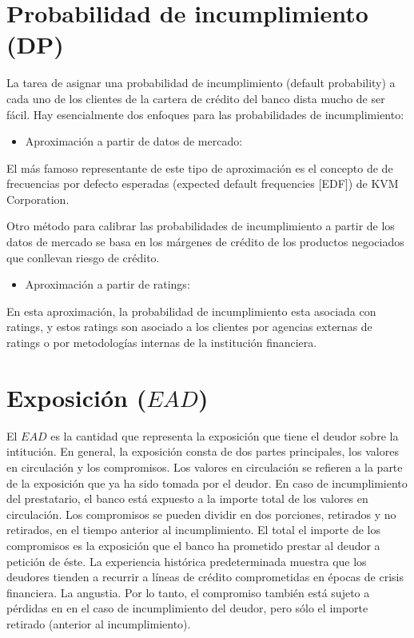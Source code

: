 \documentclass[
  12pt,
]{krantz}
\providecommand{\tightlist}{%
  \setlength{\itemsep}{0pt}\setlength{\parskip}{0pt}}
\theoremstyle{definition}
\theoremstyle{definition}
\theoremstyle{definition}
\theoremstyle{remark}
\begin{document}
\hypertarget{probabilidad-de-incumplimiento-dp}{%
\section{Probabilidad de incumplimiento (DP)}\label{probabilidad-de-incumplimiento-dp}}

La tarea de asignar una probabilidad de incumplimiento (default probability) a cada uno de los clientes de la cartera de crédito del banco dista mucho de ser fácil. Hay esencialmente dos enfoques para las probabilidades de incumplimiento:

\begin{itemize}
\tightlist
\item
  Aproximación a partir de datos de mercado:
\end{itemize}

El más famoso representante de este tipo de aproximación es el concepto de de frecuencias por defecto esperadas (expected default frequencies {[}EDF{]}) de KVM Corporation.

Otro método para calibrar las probabilidades de incumplimiento a partir de los datos de mercado se basa en los márgenes de crédito de los productos negociados que conllevan riesgo de crédito.

\begin{itemize}
\tightlist
\item
  Aproximación a partir de ratings:
\end{itemize}

En esta aproximación, la probabilidad de incumplimiento esta asociada con ratings, y estos ratings son asociado a los clientes por agencias externas de ratings o por metodologías internas de la institución financiera.

\hypertarget{exposicion-ead}{%
\section{\texorpdfstring{Exposición (\(EAD\))}{Exposición (EAD)}}\label{exposicion-ead}}

El \(EAD\) es la cantidad que representa la exposición que tiene el deudor sobre la intitución. En general, la exposición consta de dos partes principales, los valores en circulación y los compromisos. Los valores en circulación se refieren a la parte de la exposición que ya ha sido tomada por el deudor. En caso de incumplimiento del prestatario, el banco está expuesto a la importe total de los valores en circulación.
Los compromisos se pueden dividir en dos porciones, retirados y no retirados, en el tiempo anterior al incumplimiento. El total el importe de los compromisos es la exposición que el banco ha prometido prestar al deudor a petición de éste. La experiencia histórica predeterminada muestra que los deudores tienden a recurrir a líneas de crédito comprometidas en épocas de crisis financiera. La angustia. Por lo tanto, el compromiso también está sujeto a pérdidas en en el caso de incumplimiento del deudor, pero sólo el importe retirado (anterior al incumplimiento).
\end{document}
